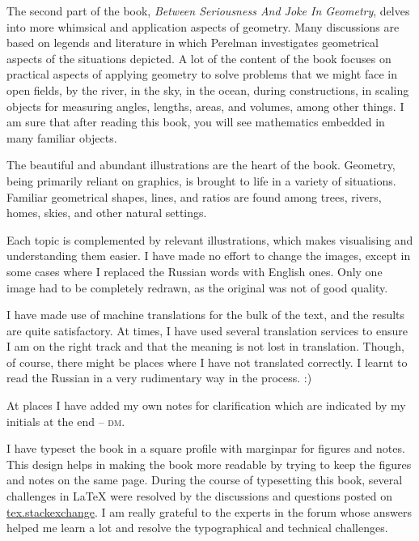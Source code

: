 The second part of the book, \emph{Between Seriousness And Joke In Geometry}, delves into more whimsical and application aspects of geometry. Many discussions are based on legends and literature in which Perelman investigates geometrical aspects of the situations depicted. A lot of the content of the book focuses on practical aspects of applying geometry to solve problems that we might face in open fields, by the river, in the sky, in the ocean, during constructions, in scaling objects for measuring angles, lengths, areas, and volumes, among other things. I am sure that after reading this book, you will see mathematics embedded in many familiar objects. 


The beautiful and abundant illustrations are the heart of the book. Geometry, being primarily reliant on graphics, is brought to life in a variety of situations. Familiar geometrical shapes, lines, and ratios are found among trees, rivers, homes, skies, and other natural settings. 

Each topic is complemented by relevant illustrations, which makes visualising and understanding them easier. I have made no effort to change the images, except in some cases where I replaced the Russian words with English ones. Only one image had to be completely redrawn, as the original was not of good quality.

I have made use of machine translations for the bulk of the text, and the results are quite satisfactory. At times, I have used several translation services to ensure I am on the right track and that the meaning is not lost in translation. Though, of course, there might be places where I have not translated correctly. I learnt to read the Russian in a very rudimentary way in the process. :)

At places I have added my own notes for clarification which are indicated by my initials at the end -- \textsc{dm}.

I have typeset the book in a square profile with marginpar for figures and notes. This design helps in making the book more readable by trying to keep the figures and notes on the same page. During the course of typesetting this book, several challenges in \LaTeX{} were resolved by the discussions and questions posted on \href{https://tex.stackexchange.com}{tex.stackexchange}. I am really grateful to the experts in the forum whose answers helped me learn a lot and resolve the typographical and technical challenges.

